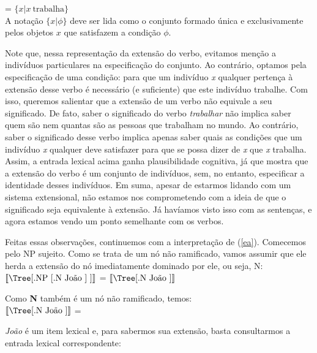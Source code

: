 \n {} = $\{x | x\ \text{trabalha}\}$\\

\n A notação $\{x | \phi \}$ deve ser lida como o conjunto formado única e exclusivamente pelos objetos $x$ que satisfazem a condição $\phi$.

Note que, nessa representação da extensão do verbo, evitamos menção a indivíduos particulares na especificação do conjunto. Ao contrário, optamos pela especificação de uma condição: para que um indivíduo \textit{x} qualquer pertença à extensão desse verbo é necessário (e suficiente) que este indivíduo trabalhe. Com isso, queremos salientar que a extensão de um verbo não equivale a seu significado. De fato, saber o significado do verbo \textit{trabalhar} não implica saber quem são nem quantas são as pessoas que trabalham no mundo. Ao contrário, saber o significado desse verbo implica apenas saber quais as condições que um indivíduo \textit{x} qualquer deve satisfazer para que se possa dizer de \textit{x} que \textit{x} trabalha. Assim, a entrada lexical acima ganha plausibilidade cognitiva, já que mostra que a extensão do verbo é um conjunto de indivíduos, sem, no entanto, especificar a identidade desses indivíduos. Em suma, apesar de estarmos lidando com um sistema extensional, não estamos nos comprometendo com a ideia de que o significado seja equivalente à extensão. Já havíamos visto isso com as sentenças, e agora estamos vendo um ponto semelhante com os verbos.

Feitas essas observações, continuemos com a interpretação de (\ref{ea}). Comecemos pelo NP sujeito. Como se trata de um nó não ramificado, vamos assumir que ele herda a extensão do nó imediatamente dominado por ele, ou seja, N:\\

$\left \llbracket \vcenter{%
	\hbox{\Tree [.NP [.N João ] ]}} \right \rrbracket$ = $\left \llbracket \vcenter{%
	\hbox{\Tree [.N João ]}} \right \rrbracket$

\bigskip

\n Como \textbf{N} também é um nó não ramificado, temos:\\

$\left \llbracket \vcenter{%
	\hbox{\Tree [.N João ]}} \right \rrbracket$ = 

\bigskip

\n \textit{João} é um item lexical e, para sabermos sua extensão,
basta consultarmos a entrada lexical correspondente:\\

